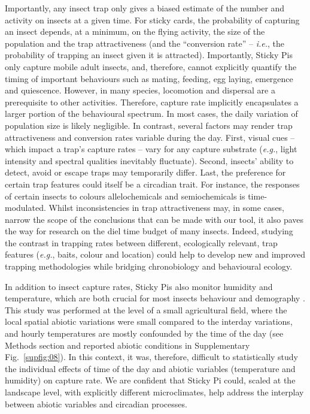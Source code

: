 \documentclass[12pt]{article}
\begin{document}
\begin{linenumbers}
				
		Importantly, any insect trap only gives a biased estimate of the number and activity on insects at a given time.
		For sticky cards, the probability of capturing an insect depends, at a minimum, on the flying activity, the size of the population and the trap attractiveness (and the ``conversion rate'' – \emph{i.e.}, the probability of trapping an insect given it is attracted). Importantly, Sticky Pis only capture mobile adult insects, and, therefore, cannot explicitly quantify the timing of important behaviours such as mating, feeding, egg laying, emergence and quiescence.
		However, in many species, locomotion and dispersal are a prerequisite to other activities.
		Therefore, capture rate implicitly encapsulates a larger portion of the behavioural spectrum.
		In most cases, the daily variation of population size is likely negligible. In contrast, several factors may render trap attractiveness and conversion rates variable during the day. First, visual cues – which impact a trap’s capture rates\cite{clare_pheromone_2000, sukovata_importance_2020} – vary for any capture substrate (\emph{e.g.}, light intensity and spectral qualities inevitably fluctuate).
		Second, insects' ability to detect, avoid or escape traps may temporarily differ. Last, the preference for certain trap features could itself be a circadian trait. For instance, the responses of certain insects to colours\cite{lazopulo_daytime_2019} allelochemicals\cite{barrozo_response_2004,eilerts_odor-specific_2018} and semiochemicals\cite{rosen_circadian_2003, schendzielorz_time_2012, zhukovskaya_circadian_1995} is time-modulated.
		Whilst inconsistencies in trap attractiveness may, in some cases, narrow the scope of the conclusions that can be made with our tool, it also paves the way for research on the diel time budget of many insects.
		Indeed, studying the contrast in trapping rates between different, ecologically relevant, trap features (\emph{e.g.}, baits, colour and location) could help to develop new and improved trapping methodologies while bridging chronobiology and behavioural ecology.

		In addition to insect capture rates, Sticky Pis also monitor humidity and temperature, which are both crucial for most insects behaviour and demography \cite{jaworski_effect_2013,pawson_predicting_2017}.
		This study was performed at the level of a small agricultural field, where the local spatial abiotic variations were small compared to the interday variations, and hourly temperatures are mostly confounded by the time of the day (see Methods section and reported abiotic conditions in Supplementary Fig.~\ref{supfig:08}). 
		In this context, it was, therefore, difficult to statistically study the individual effects of time of the day and abiotic variables (temperature and humidity) on capture rate. 
		We are confident that Sticky Pi could, scaled at the landscape level, with explicitly different microclimates, help address the interplay between abiotic variables and circadian processes.


\end{linenumbers}
\end{document}
